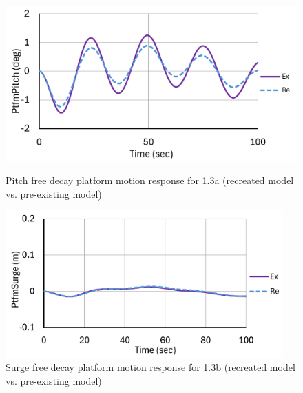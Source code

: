 \documentclass[a4paper, 11pt]{article}
\begin{document}
\begin{figure}[H]
    \begin{minipage}{0.47\textwidth}
        \centering
        \includegraphics[width=1\textwidth]{1.3a_pitch_mine_1.png}
        \caption{\small Pitch free decay platform motion response for 1.3a (recreated model vs. pre-existing model)}
        \label{fig:1.3a_pitch_mine_recreated}
    \end{minipage}
    \hfill
    \begin{minipage}{0.49\textwidth}
        \centering
        \includegraphics[width=0.95\textwidth]{1.3b_surge_mine_1.png}
        \caption{\small Surge free decay platform motion response for 1.3b (recreated model vs. pre-existing model)}
        \label{fig:1.3b_surge_mine_recreated}
    \end{minipage}
\end{figure}
\end{document}
